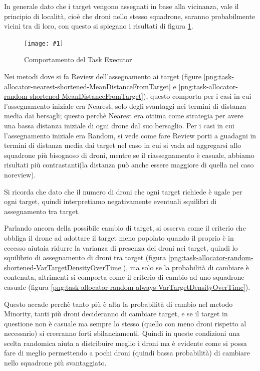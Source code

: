 \documentclass[a4paper,11pt,oneside, table]{article}
\newcommand{\putimage}[4] {
	\begin{figure}[H]
	    \centering
	    \texttt{[image: \#1]}
	    \caption{#2}\label{#3}
	\end{figure}
}
\begin{document}
In generale dato che i target vengono assegnati in base alla vicinanza, vale il principio di localit\`a, cio\`e che droni nello stesso squadrone, saranno probabilmente vicini tra di loro, con questo si spiegano i risultati di figura \ref{png:task-allocator-no-review-MeanDistanceFromTarget}.

\putimage{images/experiments/task-allocator-no-review/MeanDistanceFromTarget.png}{Comportamento del Task Executor}{png:task-allocator-no-review-MeanDistanceFromTarget}{0.99}

Nei metodi dove si fa Review dell'assegnamento ai target (figure \ref{png:task-allocator-nearest-shortened-MeanDistanceFromTarget} e \ref{png:task-allocator-random-shortened-MeanDistanceFromTarget}), questo comporta per i casi in cui l'assegnamento iniziale era Nearest, solo degli svantaggi nei termini di distanza media dai bersagli; questo perchè Nearest era ottima come strategia per avere una bassa distanza iniziale di ogni drone dal suo bersaglio.
Per i casi in cui l'assegnamento iniziale era Random, si vede come fare Review porti a guadagni in termini di distanza media dai target nel caso in cui si vada ad aggregarsi allo squadrone più bisognoso di droni, mentre se il riassegnamento è casuale, abbiamo risultati più contrastanti(la distanza può anche essere maggiore di quella nel caso noreview).

Si ricorda che dato che il numero di droni che ogni target richiede  \`e ugale per ogni target, quindi interpretiamo negativamente eventuali squilibri di assegnamento tra target.

Parlando ancora della possibile cambio di target, si osserva come il criterio che obbliga il drone ad adottare il target meno popolato quando il proprio \`e in eccesso aiutaia ridurre la varianza di presenza dei droni nei target, quindi lo squilibrio di assegnamento di droni tra target (figura \ref{png:task-allocator-random-shortened-VarTargetDensityOverTime}), ma solo se la probabilit\`a di cambiare \`e contenuta, altrimenti si comporta come il criterio di cambio ad uno squadrone casuale (figura \ref{png:task-allocator-random-always-VarTargetDensityOverTime}).

Questo accade perch\`e tanto pi\`u \`e alta la probabilit\`a di cambio nel metodo Minority, tanti pi\`u droni decideranno di cambiare target, e se il target in questione non \`e casuale ma sempre lo stesso (quello con meno droni rispetto al necessario) si creeranno forti sbilanciamenti. 
Quindi in queste condizioni una scelta randomica aiuta a distribuire meglio i droni ma \`e evidente come si possa fare di meglio permettendo a pochi droni (quindi bassa probabilit\`a) di cambiare nello squadrone pi\`u svantaggiato.
\end{document}
